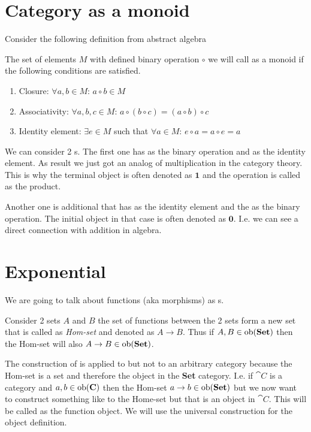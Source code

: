 \section{Category as a monoid}
Consider the following definition from abstract algebra
\begin{definition}[Monoid]
  \label{def:monoid}
  The set of elements $M$ with defined binary operation $\circ$ we will call
  as a monoid if the following conditions are satisfied.
  \begin{enumerate}
  \item Closure: $\forall a, b \in M$: $a \circ b \in M$
  \item Associativity: $\forall a, b, c \in M$:
    $a \circ \left( b \circ c \right) =
    \left( a \circ b \right) \circ c$
  \item Identity element: $\exists e \in M$ such that
    $\forall a \in M$: $e \circ a = a \circ e = a$
  \end{enumerate}
\end{definition}

We can consider 2 s. The first one has
 as the binary operation and
 as the identity element. As result we
just got an analog of multiplication in the category theory. This is why
the terminal object is often denoted as $\mathbf{1}$ and the operation
is called as the product. 

Another one is additional  that has
 as the identity element and the
 as the binary operation. The initial object in
that case  is often denoted as $\mathbf{0}$. I.e. we can see a direct
connection with addition in algebra.


\section{Exponential}
We are going to talk about functions (aka morphisms) as
s. 

\begin{example}
\label{ex:homset}
Consider 2 sets $A$ and $B$ the set of functions between the 2 sets
form a new set that is called as \textit{Hom-set} and denoted as $A
\to B$. Thus if $A,B \in \mathrm{ob}(\mathbf{Set})$ then the Hom-set will also $A
\to B \in \mathrm{ob}(\mathbf{Set})$. 
\end{example}

The construction of  is applied to
 but not to an arbitrary category because
the Hom-set is a set and therefore the object in the \textbf{Set}
category. I.e. if $\cat{C}$ is a category and $a, b \in \mathrm{ob}(\mathbf{C})$
then the Hom-set $a \to b \in \mathrm{ob}(\mathbf{Set})$ but we now want to
construct something like to the Home-set but that is an object in
$\cat{C}$. This will be called as the function object. We will use the
universal construction for the object definition.

